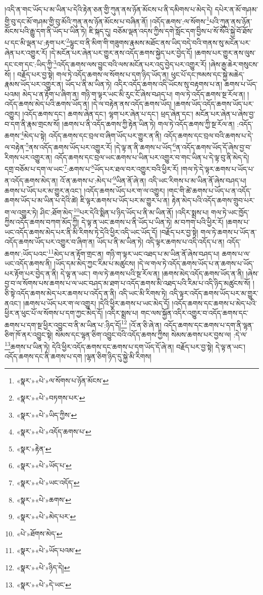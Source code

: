 །འདི་ན་གང་ཡོད་པ་མ་ཡིན་པ་དེའི་རྟེན་ཅན་གྱི་ཀུན་ནས་ཉོན་མོངས་པ་ནི་དམིགས་པ་མེད་དེ། དཔེར་ན་མོ་གཤམ་གྱི་བུ་དང་མོ་གཤམ་གྱི་བུ་མོའི་ཀུན་ནས་ཉོན་མོངས་པ་བཞིན་ནོ། །འདོད་ཆགས་:ལ་སོགས་\footnote{«སྣར་»«པེ་»ལ་སོགས་པ་ཉོན་མོངས་}པའི་ཀུན་ནས་ཉོན་མོངས་པའི་རྒྱུ་དག་ནི་ཡོད་པ་ཡིན་ཏེ། ཇི་སྐད་དུ། བཅོམ་ལྡན་འདས་ཀྱིས་དགེ་སློང་དག་བྱིས་པ་སོ་སོའི་སྐྱེ་བོ་ཐོས་པ་དང་མི་ལྡན་པ་:རྟག་པར་\footnote{«སྣར་»«པེ་»བཏགས་པར་}ལྷུང་བ་ནི་མིག་གི་གཟུགས་རྣམས་མཐོང་ནས་ཡིད་བདེ་བའི་གནས་སུ་མངོན་པར་ཞེན་པར་འགྱུར་རོ། །དེ་མངོན་པར་ཞེན་པར་གྱུར་ནས་འདོད་ཆགས་སྐྱེད་པར་བྱེད་དོ། །ཆགས་པར་གྱུར་ནས་ལུས་དང་ངག་དང་:ཡིད་ཀྱི་\footnote{«སྣར་»«པེ་»ཡིད་ཀྱིས་}འདོད་ཆགས་ལས་བྱུང་བའི་ལས་མངོན་པར་འདུ་བྱེད་པར་འགྱུར་རོ། །ཞེས་རྒྱ་ཆེར་གསུངས་སོ། །
བརྗོད་པར་བྱ་སྟེ། གལ་ཏེ་འདོད་ཆགས་ལ་སོགས་པ་དག་ཉིད་ཡོད་ན། ཕུང་པོ་དང་ཁམས་དང་སྐྱེ་མཆེད་རྣམས་ཡོད་པར་འགྱུར་ན། ཡོད་པ་ནི་མ་ཡིན་ཏེ། འདིར་འདོད་ཆགས་འདི་ཡོངས་སུ་བརྟགས་པ་ན། ཆགས་པ་ཡོད་པའམ། མེད་པ་ན་རྟོག་པ་ཞིག་ན། གཉི་ག་ལྟར་ཡང་མི་རུང་ངོ་ཞེས་བཤད་པ། གལ་ཏེ་འདོད་ཆགས་སྔ་རོལ་ན། །འདོད་ཆགས་མེད་པའི་ཆགས་ཡོད་ན། །དེ་ལ་བརྟེན་ནས་འདོད་ཆགས་ཡོད། །ཆགས་ཡོད་འདོད་ཆགས་ཡོད་པར་འགྱུར། །འདོད་ཆགས་དང་། ཆགས་ཞེན་དང་། ལྷག་པར་ཞེན་པ་དང་། ཕྲད་ཞེན་དང་། མངོན་པར་ཞེན་པ་ཞེས་བྱ་བ་དག་ནི་རྣམ་གྲངས་སོ། །ཆགས་པ་ནི་འདོད་ཆགས་ཀྱི་རྟེན་ཡིན་ཏེ། གལ་ཏེ་འདོད་ཆགས་ཀྱི་སྔ་རོལ་ན། :འདོད་ཆགས་\footnote{«སྣར་»«པེ་»འདོད་ཆགས་པ་}མེད་པ་སྟེ། འདོད་ཆགས་དང་བྲལ་བ་ཞིག་ཡོད་པར་གྱུར་ན་ནི། འདོད་ཆགས་དང་བྲལ་བའི་ཆགས་པ་དེ་ལ་བརྟེན་\footnote{«སྣར་»རྟེན་}ནས་འདོད་ཆགས་ཡོད་པར་འགྱུར་རོ། །དེ་ལྟ་ན་ནི་ཆགས་པ་ཡོད་\footnote{«སྣར་»«པེ་»ཡོད་པ་}ན་འདོད་ཆགས་ཡོད་དོ་ཞེས་བྱ་བ་རིགས་པར་འགྱུར་ན། འདོད་ཆགས་དང་བྲལ་ཡང་ཆགས་པ་ཡིན་པར་འགྱུར་བ་གང་ཡིན་པ་དེ་ལྟ་བུ་ནི་མེད་དེ། དགྲ་བཅོམ་པ་དག་ལ་ཡང་\footnote{«སྣར་»«པེ་»ཡང་འདོད་}:ཆགས་པ་\footnote{«སྣར་»«པེ་»ཆགས་}ཡོད་པར་ཐལ་བར་འགྱུར་བའི་ཕྱིར་རོ། །གལ་ཏེ་དེ་ལྟར་ཆགས་པ་ཡོད་པ་ན་འདོད་ཆགས་མེད་ན། འོ་ན་ཆགས་པ་:མེད་པ་\footnote{«སྣར་»«པེ་»མེད་པར་}ཡིན་ནོ་ཞེ་ན། འདི་ཡང་རིགས་པ་མ་ཡིན་ནོ་ཞེས་བཤད་པ། ཆགས་པ་ཡོད་པར་མ་གྱུར་ནའང་། །འདོད་ཆགས་ཡོད་པར་ག་ལ་འགྱུར། །གང་གི་ཚེ་ཆགས་པ་ཡོད་པ་ན་འདོད་ཆགས་ཡོད་པ་མ་ཡིན་པ་དེའི་ཚེ། ཇི་ལྟར་ཆགས་པ་ཡོད་པར་མ་གྱུར་པ་ན། རྟེན་མེད་པའི་འདོད་ཆགས་གྲུབ་པར་ག་ལ་འགྱུར་ཏེ། ཤིང་:ཐོག་མེད་\footnote{«པེ་»ཐོགས་མེད་}པར་དེའི་སྨིན་པ་ཉིད་ཡོད་པ་ནི་མ་ཡིན་ནོ། །འདིར་སྨྲས་པ། གལ་ཏེ་ཡང་ཁྱོད་ཀྱིས་འདོད་ཆགས་བཀག་མོད་ཀྱི། དེ་ལྟ་ན་ཡང་ཆགས་པ་ནི་ཡོད་པ་ཡིན་ཏེ། མ་བཀག་པའི་ཕྱིར་རོ། །ཆགས་པ་ཡང་འདོད་ཆགས་མེད་པར་ནི་མི་རིགས་ཏེ་དེའི་ཕྱིར་འདི་ཡང་ཡོད་དོ། །བརྗོད་པར་བྱ་སྟེ། གལ་ཏེ་ཆགས་པ་ཡོད་ན་འདོད་ཆགས་ཡོད་པར་འགྱུར་བ་ཞིག་ན། ཡོད་པ་ནི་མ་ཡིན་ཏེ། འདི་ལྟར་ཆགས་པ་འདི་འདོད་པ་ན། འདོད་ཆགས་:ཡོད་པའང་\footnote{«སྣར་»«པེ་»ཡོད་པའམ་}མེད་པ་ན་རྟོག་གྲང་ན། གཉི་ག་ལྟར་ཡང་འཐད་པ་མ་ཡིན་ནོ་ཞེས་བཤད་པ། ཆགས་པ་ལ་ཡང་འདོད་ཆགས་ནི། །ཡོད་དམ་མེད་ཀྱང་རིམ་པ་མཚུངས། །དེ་ལ་གལ་ཏེ་འདོད་ཆགས་ཡོད་པ་ན་ཆགས་པ་ཡོད་པར་རྟོག་པར་བྱེད་ན་ནི། དེ་ལྟ་ན་ཡང་། གལ་ཏེ་ཆགས་པའི་སྔ་རོལ་ན། །ཆགས་མེད་འདོད་ཆགས་ཡོད་ན་ནི། །ཞེས་བྱ་བ་ལ་སོགས་པས་ཆགས་པ་ལ་ཡང་བཤད་མ་ཐག་པ་འདོད་ཆགས་མི་འཐད་པའི་རིམ་པ་འདི་ཉིད་མཚུངས་སོ། །ཅི་སྟེ་འདོད་ཆགས་མེད་པར་ཆགས་པ་འདོད་ན་ནི། འདི་ཡང་མི་རིགས་ཏེ། འདི་ལྟར་འདོད་ཆགས་ཡོད་པར་མ་གྱུར་ནའང་། །ཆགས་པ་ཡོད་པར་ག་ལ་འགྱུར། །དེའི་ཕྱིར་ཆགས་པ་ཡང་མེད་དོ། །འདོད་ཆགས་དང་ཆགས་པ་མེད་པའི་ཕྱིར་ན་ཕུང་པོ་ལ་སོགས་པ་དག་ཀྱང་མེད་དོ། །འདིར་སྨྲས་པ། གང་ལས་སྐྱོན་འདིར་འགྱུར་བ་འདོད་ཆགས་དང་ཆགས་པ་དག་སྔ་ཕྱིར་འབྱུང་བ་ནི་མ་ཡིན་པ་:ཉིད་དོ།\footnote{«སྣར་»«པེ་»ཉིད་དེ།} །འོ་ན་ཅི་ཞེ་ན། འདོད་ཆགས་དང་ཆགས་པ་དག་ནི་ལྷན་ཅིག་ཁོ་ནར་འབྱུང་སྟེ། སེམས་དང་ལྷན་ཅིག་འབྱུང་བའི་འདོད་ཆགས་ཀྱིས། སེམས་ཆགས་པར་བྱས་ལ། :དེ་ལ་\footnote{«སྣར་»«པེ་»དེ་ཡང་}ཆགས་པ་ཡིན་ཏེ། དེའི་ཕྱིར་འདོད་ཆགས་དང་ཆགས་པ་དག་ཡོད་དོ་ཞེ་ན། བརྗོད་པར་བྱ་སྟེ། དེ་ལྟ་ན་ཡང་། འདོད་ཆགས་དང་ནི་ཆགས་པ་དག །ལྷན་ཅིག་ཉིད་དུ་སྐྱེ་མི་རིགས། 